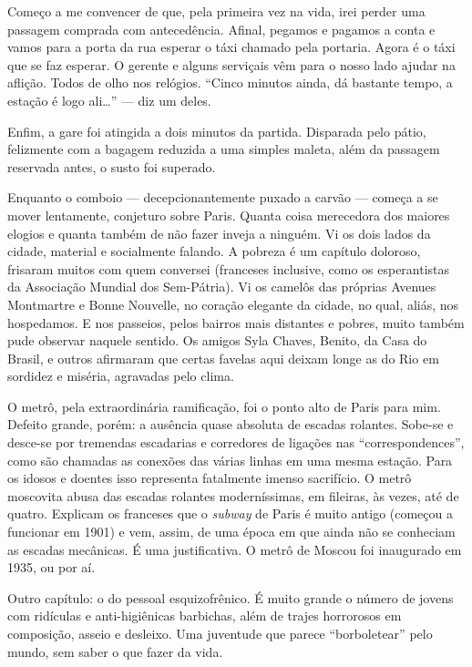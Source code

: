 Começo a me convencer de que, pela primeira vez na vida, irei perder uma passagem comprada com antecedência. Afinal, pegamos e pagamos a conta e vamos para a porta da rua esperar o táxi chamado pela portaria. Agora é o táxi que se faz esperar. O gerente e alguns serviçais vêm para o nosso lado ajudar na aflição. Todos de olho nos relógios. ``Cinco minutos ainda, dá bastante tempo, a estação é logo ali\ldots'' --- diz um deles.

Enfim, a gare foi atingida a dois minutos da partida. Disparada pelo pátio, felizmente com a bagagem reduzida a uma simples maleta, além da passagem reservada antes, o susto foi superado.

Enquanto o comboio --- decepcionantemente puxado a carvão --- começa a se mover lentamente, conjeturo sobre Paris. Quanta coisa merecedora dos maiores elogios e quanta também de não fazer inveja a ninguém. Vi os dois lados da cidade, material e socialmente falando. A pobreza é um capítulo doloroso, frisaram muitos com quem conversei (franceses inclusive, como os esperantistas da Associação Mundial dos Sem-Pátria). Vi os camelôs das próprias Avenues Montmartre e Bonne Nouvelle, no coração elegante da cidade, no qual, aliás, nos hospedamos. E nos passeios, pelos bairros mais distantes e pobres, muito também pude observar naquele sentido. Os amigos Syla Chaves, Benito, da Casa do Brasil, e outros afirmaram que certas favelas aqui deixam longe as do Rio em sordidez e miséria, agravadas pelo clima.

O metrô, pela extraordinária ramificação, foi o ponto alto de Paris para mim. Defeito grande, porém: a ausência quase absoluta de escadas rolantes. Sobe-se e desce-se por tremendas escadarias e corredores de ligações nas ``correspondences'', como são chamadas as conexões das várias linhas em uma mesma estação. Para os idosos e doentes isso representa fatalmente imenso sacrifício. O metrô moscovita abusa das escadas rolantes moderníssimas, em fileiras, às vezes, até de quatro. Explicam os franceses que o \textit{subway} de Paris é muito antigo (começou a funcionar em 1901) e vem, assim, de uma época em que ainda não se conheciam as escadas mecânicas. É uma justificativa. O metrô de Moscou foi inaugurado em 1935, ou por aí.

Outro capítulo: o do pessoal esquizofrênico. É muito grande o número de jovens com ridículas e anti-higiênicas barbichas, além de trajes horrorosos em composição, asseio e desleixo. Uma juventude que parece ``borboletear'' pelo mundo, sem saber o que fazer da vida.

